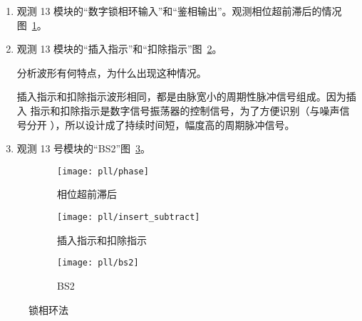 \documentclass[../main]{subfiles}
\begin{document}
\begin{enumerate}
  \item 观测 13 模块的“数字锁相环输入”和“鉴相输出”。观测相位超前滞后的情况
    图~\ref{fig:pll/phase}。
  \item 观测 13 模块的“插入指示”和“扣除指示”图~\ref{fig:pll/insert_subtract}。

    \begin{Exercise}[title = 思考, label = ex:\arabic{chapter}\arabic{Exercise}]
      分析波形有何特点，为什么出现这种情况。
    \end{Exercise}

    \begin{Answer}
      插入指示和扣除指示波形相同，都是由脉宽小的周期性脉冲信号组成。因为插入
      指示和扣除指示是数字信号振荡器的控制信号，为了方便识别（与噪声信号分开
      ），所以设计成了持续时间短，幅度高的周期脉冲信号。
    \end{Answer}

  \item 观测 13 号模块的“BS2”图~\ref{fig:pll/bs2}。
\end{enumerate}

\begin{figure}[htbp]
  \centering
  \begin{subfigure}[htbp]{0.45\linewidth}
    \centering
    \texttt{[image: pll/phase]}
    \caption{相位超前滞后}%
    \label{fig:pll/phase}
  \end{subfigure}
  \quad
  \begin{subfigure}[htbp]{0.45\linewidth}
    \centering
    \texttt{[image: pll/insert\_subtract]}
    \caption{插入指示和扣除指示}%
    \label{fig:pll/insert_subtract}
  \end{subfigure}

  \begin{subfigure}[htbp]{0.45\linewidth}
    \centering
    \texttt{[image: pll/bs2]}
    \caption{BS2}%
    \label{fig:pll/bs2}
  \end{subfigure}
  \caption{锁相环法}%
  \label{fig:pll}
\end{figure}
\end{document}
